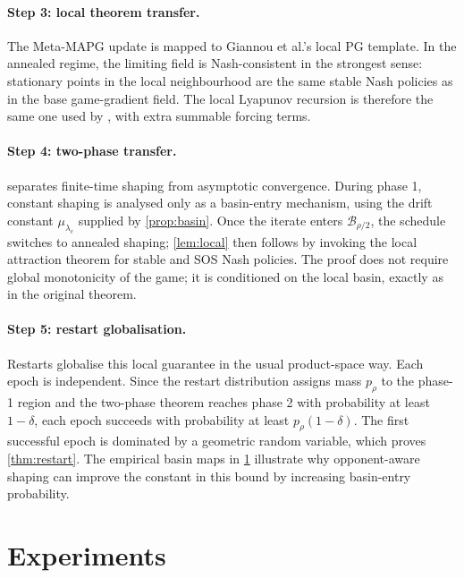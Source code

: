 \documentclass{article}
\theoremstyle{plain}
\theoremstyle{definition}
\theoremstyle{remark}
\newcommand{\B}{\mathcal{B}}
\begin{document}
\paragraph{Step 3: local theorem transfer.}
The Meta-MAPG update is mapped to Giannou et al.'s local PG template. In the annealed regime, the limiting field is Nash-consistent in the strongest sense: stationary points in the local neighbourhood are the same stable Nash policies as in the base game-gradient field. The local Lyapunov recursion is therefore the same one used by \citet{giannou2022convergence}, with extra summable forcing terms.

\paragraph{Step 4: two-phase transfer.}
 separates finite-time shaping from asymptotic convergence. During phase 1, constant shaping is analysed only as a basin-entry mechanism, using the drift constant $\mu_{\lambda_c}$ supplied by \cref{prop:basin}. Once the iterate enters $\B_{\rho/2}$, the schedule switches to annealed shaping; \cref{lem:local} then follows by invoking the local attraction theorem for stable and SOS Nash policies. The proof does not require global monotonicity of the game; it is conditioned on the local basin, exactly as in the original theorem.

\paragraph{Step 5: restart globalisation.}
Restarts globalise this local guarantee in the usual product-space way. Each epoch is independent. Since the restart distribution assigns mass $p_\rho$ to the phase-1 region and the two-phase theorem reaches phase 2 with probability at least $1-\delta$, each epoch succeeds with probability at least $p_\rho(1-\delta)$. The first successful epoch is dominated by a geometric random variable, which proves \cref{thm:restart}. The empirical basin maps in \cref{sec:experiments} illustrate why opponent-aware shaping can improve the constant in this bound by increasing basin-entry probability.

\section{Experiments}\label{sec:experiments}
\end{document}
